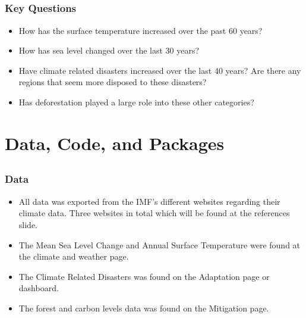 \documentclass[handout, xcolor=dvipsnames]{beamer}
\begin{document}
\subsection{}
\begin{frame}
	\frametitle{Key Questions}
	\begin{itemize}
    	\item How has the surface temperature increased over the past 60 years?
    	\item How has sea level changed over the last 30 years?
            \item Have climate related disasters increased over the last 40 years? 
                \subitem Are there any regions that seem more disposed to these disasters?
            \item Has deforestation played a large role into these other categories?
    \end{itemize}
\end{frame}

\section{Data, Code, and Packages}  
\subsection{}
\begin{frame}
	\frametitle{Data}
	\begin{itemize}
    	\item All data was exported from the IMF's different websites regarding their climate data. Three websites in total which will be found at the references slide. 
    	\item The Mean Sea Level Change and Annual Surface Temperature were found at the climate and weather page. 
    	\item The Climate Related Disasters was found on the Adaptation page or dashboard.
    	\item The forest and carbon levels data was found on the Mitigation page.
    \end{itemize}
\end{frame}
\end{document}
